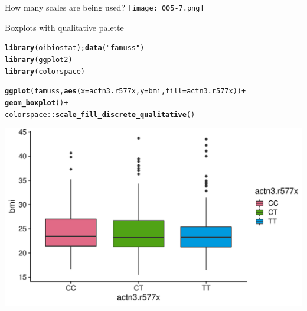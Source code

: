 \documentclass[10pt,handout]{beamer}\usepackage[]{graphicx}\usepackage[]{color}
\makeatletter
\def\maxwidth{ %
  \ifdim\Gin@nat@width>\linewidth
    \linewidth
  \else
    \Gin@nat@width
  \fi
}
\newcommand{\hlstr}[1]{\textcolor[rgb]{0.192,0.494,0.8}{#1}}%
\newcommand{\hlopt}[1]{\textcolor[rgb]{0,0,0}{#1}}%
\newcommand{\hlstd}[1]{\textcolor[rgb]{0.345,0.345,0.345}{#1}}%
\newcommand{\hlkwc}[1]{\textcolor[rgb]{0.333,0.667,0.333}{#1}}%
\newcommand{\hlkwd}[1]{\textcolor[rgb]{0.737,0.353,0.396}{\textbf{#1}}}%
\newenvironment{kframe}{%
 \def\at@end@of@kframe{}%
 \ifinner\ifhmode%
  \def\at@end@of@kframe{\end{minipage}}%
  \begin{minipage}{\columnwidth}%
 \fi\fi%
 \def\FrameCommand##1{\hskip\@totalleftmargin \hskip-\fboxsep
 \colorbox{shadecolor}{##1}\hskip-\fboxsep
     \hskip-\linewidth \hskip-\@totalleftmargin \hskip\columnwidth}%
 \MakeFramed {\advance\hsize-\width
   \@totalleftmargin\z@ \linewidth\hsize
   \@setminipage}}%
 {\par\unskip\endMakeFramed%
 \at@end@of@kframe}
\newenvironment{knitrout}{}{} %
\makeatother
\begin{document}
\begin{frame}{How many scales are being used?}
	\centering
	\texttt{[image: 005-7.png]}
\end{frame}


\begin{frame}[fragile]{Boxplots with qualitative palette}
\begin{knitrout}\tiny
{}\color{fgcolor}\begin{kframe}
\begin{alltt}
\hlkwd{library}\hlstd{(oibiostat);} \hlkwd{data}\hlstd{(}\hlstr{"famuss"}\hlstd{)}
\hlkwd{library}\hlstd{(ggplot2)}
\hlkwd{library}\hlstd{(colorspace)}

\hlkwd{ggplot}\hlstd{(famuss,} \hlkwd{aes}\hlstd{(}\hlkwc{x} \hlstd{= actn3.r577x,} \hlkwc{y} \hlstd{= bmi,} \hlkwc{fill} \hlstd{= actn3.r577x))} \hlopt{+}
\hlkwd{geom_boxplot}\hlstd{()} \hlopt{+}
\hlstd{colorspace}\hlopt{::}\hlkwd{scale_fill_discrete_qualitative}\hlstd{()}
\end{alltt}
\end{kframe}

{\centering \includegraphics[width=\maxwidth]{figure/unnamed-chunk-2-1} 

}


\end{knitrout}
\end{frame}
\end{document}
